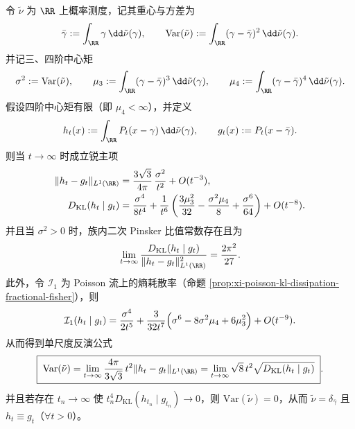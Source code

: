 \begin{corollary}\label{cor:xi-poisson-cauchy-mixture-point-leading-constants}
令 \(\tilde\nu\) 为 \(\RR\) 上概率测度，记其重心与方差为
\[
\bar\gamma:=\int_{\RR}\gamma\,\dd\tilde\nu(\gamma),
\qquad
\mathrm{Var}(\tilde\nu):=\int_{\RR}(\gamma-\bar\gamma)^2\,\dd\tilde\nu(\gamma).
\]
并记三、四阶中心矩
\[
\sigma^2:=\mathrm{Var}(\tilde\nu),\qquad
\mu_3:=\int_{\RR}(\gamma-\bar\gamma)^3\,\dd\tilde\nu(\gamma),\qquad
\mu_4:=\int_{\RR}(\gamma-\bar\gamma)^4\,\dd\tilde\nu(\gamma).
\]
假设四阶中心矩有限（即 \(\mu_4<\infty\)），并定义
\[
h_t(x):=\int_{\RR}P_t(x-\gamma)\,\dd\tilde\nu(\gamma),
\qquad
g_t(x):=P_t(x-\bar\gamma).
\]
则当 \(t\to\infty\) 时成立锐主项
\begin{align}
\|h_t-g_t\|_{L^1(\RR)}&=\frac{3\sqrt3}{4\pi}\,\frac{\sigma^2}{t^2}+O(t^{-3}),\label{eq:xi-poisson-cauchy-mixture-tv-leading}\\
D_{\mathrm{KL}}(h_t\mid g_t)&=\frac{\sigma^4}{8t^4}
+\frac{1}{t^6}\left(
\frac{3\mu_3^2}{32}
-\frac{\sigma^2\mu_4}{8}
+\frac{\sigma^6}{64}
\right)
+O(t^{-8}).\label{eq:xi-poisson-cauchy-mixture-kl-leading}
\end{align}
\noindent
并且当 \(\sigma^2>0\) 时，族内二次 Pinsker 比值常数存在且为
\begin{equation}\label{eq:xi-poisson-cauchy-mixture-kl-tv-sharp-ratio}
\lim_{t\to\infty}\frac{D_{\mathrm{KL}}(h_t\mid g_t)}{\|h_t-g_t\|_{L^1(\RR)}^2}
=\frac{2\pi^2}{27}.
\end{equation}
此外，令 \(\mathcal I_1\) 为 Poisson 流上的熵耗散率（命题 \ref{prop:xi-poisson-kl-dissipation-fractional-fisher}），则
\begin{equation}\label{eq:xi-poisson-cauchy-mixture-fisher-leading}
\mathcal I_1(h_t\mid g_t)=\frac{\sigma^4}{2t^5}
+\frac{3}{32t^7}\Bigl(\sigma^6-8\sigma^2\mu_4+6\mu_3^2\Bigr)
+O(t^{-9}).
\end{equation}
从而得到单尺度反演公式
\begin{equation}\label{eq:xi-poisson-cauchy-mixture-variance-inversion}
\boxed{\;
\mathrm{Var}(\tilde\nu)
=\lim_{t\to\infty}\frac{4\pi}{3\sqrt3}\,t^2\|h_t-g_t\|_{L^1(\RR)}
=\lim_{t\to\infty}\sqrt{8}\,t^2\sqrt{D_{\mathrm{KL}}(h_t\mid g_t)}\; }.
\end{equation}
并且若存在 \(t_n\to\infty\) 使 \(t_n^4D_{\mathrm{KL}}(h_{t_n}\mid g_{t_n})\to 0\)，则 \(\mathrm{Var}(\tilde\nu)=0\)，从而 \(\tilde\nu=\delta_{\bar\gamma}\) 且 \(h_t\equiv g_t\)（\(\forall t>0\)）。
\end{corollary}

